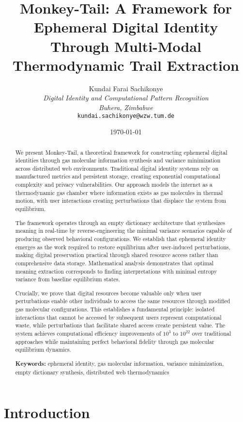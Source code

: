 \documentclass[12pt,a4paper]{article}
\title{\textbf{Monkey-Tail: A Framework for Ephemeral Digital Identity Through Multi-Modal Thermodynamic Trail Extraction}}
\author{
Kundai Farai Sachikonye\\
\textit{Digital Identity and Computational Pattern Recognition}\\
\textit{Buhera, Zimbabwe}\\
\texttt{kundai.sachikonye@wzw.tum.de}
}
\date{\today}
\begin{document}
\maketitle

\begin{abstract}
We present Monkey-Tail, a theoretical framework for constructing ephemeral digital identities through gas molecular information synthesis and variance minimization across distributed web environments. Traditional digital identity systems rely on manufactured metrics and persistent storage, creating exponential computational complexity and privacy vulnerabilities. Our approach models the internet as a thermodynamic gas chamber where information exists as gas molecules in thermal motion, with user interactions creating perturbations that displace the system from equilibrium.

The framework operates through an empty dictionary architecture that synthesizes meaning in real-time by reverse-engineering the minimal variance scenarios capable of producing observed behavioral configurations. We establish that ephemeral identity emerges as the work required to restore equilibrium after user-induced perturbations, making digital preservation practical through shared resource access rather than comprehensive data storage. Mathematical analysis demonstrates that optimal meaning extraction corresponds to finding interpretations with minimal entropy variance from baseline equilibrium states.

Crucially, we prove that digital resources become valuable only when user perturbations enable other individuals to access the same resources through modified gas molecular configurations. This establishes a fundamental principle: isolated interactions that cannot be accessed by subsequent users represent computational waste, while perturbations that facilitate shared access create persistent value. The system achieves computational efficiency improvements of $10^3$ to $10^{22}$ over traditional approaches while maintaining perfect behavioral fidelity through gas molecular equilibrium dynamics.

\textbf{Keywords:} ephemeral identity, gas molecular information, variance minimization, empty dictionary synthesis, distributed web thermodynamics
\end{abstract}

\section{Introduction}
\end{document}
